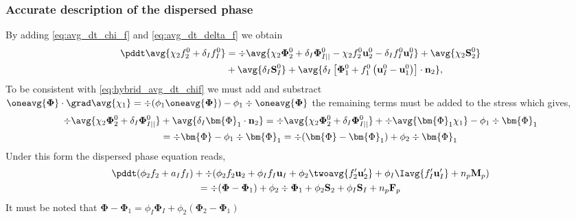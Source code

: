 \subsubsection{Accurate description of the dispersed phase}


By adding \ref{eq:avg_dt_chi_f} and \ref{eq:avg_dt_delta_f} we obtain 
\begin{align*}
    \pddt \avg{\chi_2 f_2^0 +\delta_If_I^0}
    &= \div \avg{\chi_2 \mathbf{\Phi}_2^0 + \delta_I \mathbf{\Phi}_{I||}^0 - \chi_2 f_2^0 \textbf{u}_2^0 - \delta_I f_I^0 \textbf{u}_I^0}
    + \avg{\chi_2 \textbf{S}_2^0 }\\
    &+ \avg{\delta_I\textbf{S}_I^0} 
    + \avg{\delta_I\left[
        \mathbf{\Phi}_1^0
        + f_1^0
        \left(
            \textbf{u}_I^0
            - \textbf{u}_1^0
        \right)
    \right]
    \cdot \textbf{n}_2},
\end{align*}
To be consistent with \ref{eq:hybrid_avg_dt_chif} we must add and substract $\oneavg{\mathbf{\Phi}}\cdot\grad \avg{\chi_1} = \div  (\phi_1 \oneavg{\mathbf{\Phi}}) - \phi_1 \div \oneavg{\mathbf{\Phi}}$ the remaining terms must be added to the stress which gives,
\begin{align*}
    \div \avg{\chi_2 \mathbf{\Phi}_2^0 + \delta_I \mathbf{\Phi}_{I||}^0}
    & + \avg{\delta_I \bm{\Phi}_1 \cdot \textbf{n}_2}
    =
    \div \avg{\chi_2 \mathbf{\Phi}_2^0 + \delta_I \mathbf{\Phi}_{I||}^0}
    + \div \avg{\bm{\Phi}_1 \chi_1} 
     - \phi_1 \div \bm{\Phi}_1\\
    &= \div \bm{\Phi}
     - \phi_1 \div \bm{\Phi}_1
     =  \div (\bm{\Phi} - \bm{\Phi}_1)
     + \phi_2 \div \bm{\Phi}_1\\
\end{align*}
Under this form the dispersed phase equation reads, 
\begin{multline*}
    \pddt (\phi_2 f_2 +a_If_I)
    + \div (
        \phi_2 f_2 \textbf{u}_2
        + \phi_I f_I \textbf{u}_I
        + \phi_2 \twoavg{f_2'\textbf{u}_2'} 
        + \phi_I \Iavg{f_I'\textbf{u}_I'}
        + n_p \textbf{M}_p 
        )\\
    = 
    \div (\mathbf{\Phi}  - \mathbf{\Phi}_1 )
    + \phi_2 \div \mathbf{\Phi}_1 
    + \phi_2 \textbf{S}_2
    + \phi_I \textbf{S}_I
    + n_p\textbf{F}_p
\end{multline*}
It must be noted that $\mathbf{\Phi}  - \mathbf{\Phi}_1 
= \phi_I\mathbf{\Phi}_I+\phi_2(\mathbf{\Phi}_2  - \mathbf{\Phi}_1) $

